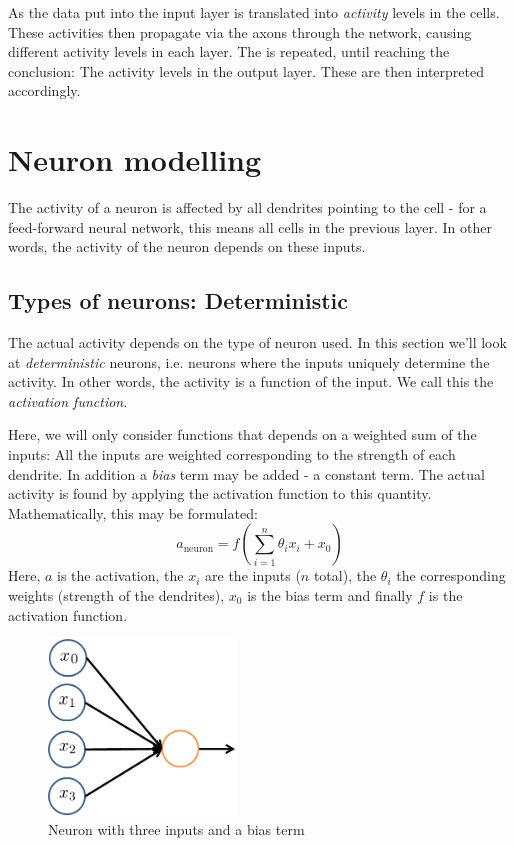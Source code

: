 \documentclass[12pt, a4paper]{article}
\numberwithin{equation}{section}
\begin{document}
As the data put into the input layer is translated into \textit{activity} levels in the cells. These activities then propagate via the axons through the network, causing different activity levels in each layer. The is repeated, until reaching the conclusion: The activity levels in the output layer. These are then interpreted accordingly.

\section{Neuron modelling}

The activity of a neuron is affected by all dendrites pointing to the cell - for a feed-forward neural network, this means all cells in the previous layer. In other words, the activity of the neuron depends on these inputs.

\subsection{Types of neurons: Deterministic}
The actual activity depends on the type of neuron used. In this section we'll look at \textit{deterministic} neurons, i.e. neurons where the inputs uniquely determine the activity. In other words, the activity is a function of the input. We call this the \textit{activation function}.

Here, we will only consider functions that depends on a weighted sum of the inputs: All the inputs are weighted corresponding to the strength of each dendrite. In addition a \textit{bias} term may be added - a constant term. The actual activity is found by applying the activation function to this quantity. Mathematically, this may be formulated:
\begin{equation}
\label{neuron_activity}
a_\textrm{neuron}=f\left(\sum_{i=1}^n \theta_i x_i + x_0\right)
\end{equation}
Here, $a$ is the activation, the $x_i$ are the inputs ($n$ total), the $\theta_i$ the corresponding weights (strength of the dendrites), $x_0$ is the bias term and finally $f$ is the activation function.

\begin{figure}
\centering
\includegraphics[width=50mm]{neuron}
\caption{Neuron with three inputs and a bias term}
\label{fig:neuron}
\end{figure}
\end{document}
